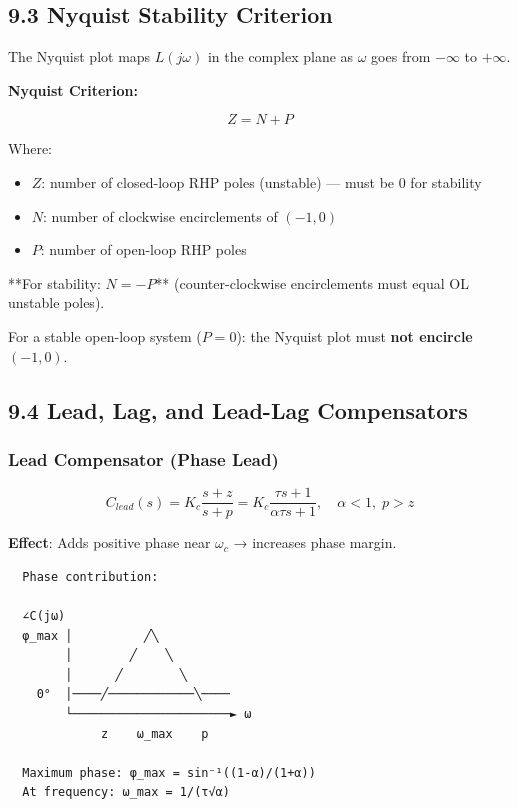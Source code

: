 \documentclass[11pt,a4paper]{book}
\begin{document}
\subsection{9.3 Nyquist Stability Criterion}

The Nyquist plot maps $L(j\omega)$ in the complex plane as $\omega$ goes from $-\infty$ to $+\infty$.

\textbf{Nyquist Criterion:}

\[Z = N + P\]

Where:
\begin{itemize}
\item $Z$: number of closed-loop RHP poles (unstable) — must be 0 for stability
\item $N$: number of clockwise encirclements of $(-1, 0)$
\item $P$: number of open-loop RHP poles
\end{itemize}

**For stability: $N = -P$** (counter-clockwise encirclements must equal OL unstable poles).

For a stable open-loop system ($P = 0$): the Nyquist plot must \textbf{not encircle} $(-1, 0)$.

\medskip\noindent\hrulefill\medskip

\subsection{9.4 Lead, Lag, and Lead-Lag Compensators}

\subsubsection{Lead Compensator (Phase Lead)}

\[C_{lead}(s) = K_c \frac{s + z}{s + p} = K_c \frac{\tau s + 1}{\alpha \tau s + 1}, \quad \alpha < 1, \; p > z\]

\textbf{Effect}: Adds positive phase near $\omega_c$ → increases phase margin.

\begin{lstlisting}
  Phase contribution:
  
  ∠C(jω)
  φ_max │          ╱╲
        │        ╱    ╲
        │      ╱        ╲
    0°  │────╱────────────╲────
        └──────────────────────► ω
             z    ω_max    p
             
  Maximum phase: φ_max = sin⁻¹((1-α)/(1+α))
  At frequency: ω_max = 1/(τ√α)
\end{lstlisting}
\end{document}
